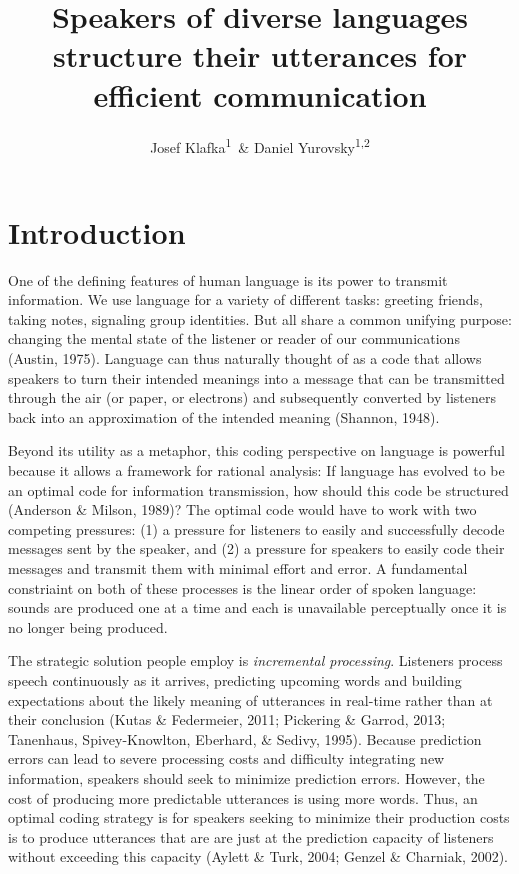 \documentclass[man,floatsintext]{apa6}
\title{Speakers of diverse languages structure their utterances for efficient communication}
\author{Josef Klafka\textsuperscript{1}~\& Daniel Yurovsky\textsuperscript{1,2}}
\date{}
\affiliation{
\vspace{0.5cm}
\textsuperscript{1} Carnegie Mellon University\\\textsuperscript{2} University of Chicago}
\begin{document}
\maketitle

\hypertarget{introduction}{%
\section{Introduction}\label{introduction}}

One of the defining features of human language is its power to transmit information. We use language for a variety of different tasks: greeting friends, taking notes, signaling group identities. But all share a common unifying purpose: changing the mental state of the listener or reader of our communications (Austin, 1975). Language can thus naturally thought of as a code that allows speakers to turn their intended meanings into a message that can be transmitted through the air (or paper, or electrons) and subsequently converted by listeners back into an approximation of the intended meaning (Shannon, 1948).

Beyond its utility as a metaphor, this coding perspective on language is powerful because it allows a framework for rational analysis: If language has evolved to be an optimal code for information transmission, how should this code be structured (Anderson \& Milson, 1989)? The optimal code would have to work with two competing pressures: (1) a pressure for listeners to easily and successfully decode messages sent by the speaker, and (2) a pressure for speakers to easily code their messages and transmit them with minimal effort and error. A fundamental constriaint on both of these processes is the linear order of spoken language: sounds are produced one at a time and each is unavailable perceptually once it is no longer being produced.

The strategic solution people employ is \emph{incremental processing}. Listeners process speech continuously as it arrives, predicting upcoming words and building expectations about the likely meaning of utterances in real-time rather than at their conclusion (Kutas \& Federmeier, 2011; Pickering \& Garrod, 2013; Tanenhaus, Spivey-Knowlton, Eberhard, \& Sedivy, 1995). Because prediction errors can lead to severe processing costs and difficulty integrating new information, speakers should seek to minimize prediction errors. However, the cost of producing more predictable utterances is using more words. Thus, an optimal coding strategy is for speakers seeking to minimize their production costs is to produce utterances that are are just at the prediction capacity of listeners without exceeding this capacity (Aylett \& Turk, 2004; Genzel \& Charniak, 2002).
\end{document}
